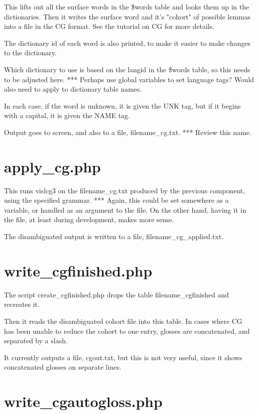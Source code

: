 \documentclass[a4paper,10pt]{article}
\begin{document}
This lifts out all the surface words in the \$words table and looks them up in the dictionaries.  Then it writes the surface word and it's "cohort" of possible lemmas into a file in the CG format.  See the tutorial on CG for more details.

The dictionary id of each word is also printed, to make it easier to make changes to the dictionary.

Which dictionary to use is based on the langid in the \$words table, so this needs to be adjusted here.
*** Perhaps use global variables to set language tags?  Would also need to apply to dictionary table names.

In each case, if the word is unknown, it is given the UNK tag, but if it begins with a capital, it is given the NAME tag.

Output goes to screen, and also to a file, filename\_cg.txt.
*** Review this name.


\section{apply\_cg.php}
\label{sec:applycg}

This runs vislcg3 on the filename\_cg.txt produced by the previous component, using the specified grammar.
*** Again, this could be set somewhere as a variable, or handled as an argument to the file.  On the other hand, having it in the file, at least during development, makes more sense.

The disambiguated output is written to a file, filename\_cg\_applied.txt.


\section{write\_cgfinished.php}
\label{sec:cgfinished}

The script create\_cgfinished.php drops the table filename\_cgfinished and recreates it.

Then it reads the disambiguated cohort file into this table.  In cases where CG has been unable to reduce the cohort to one entry, glosses are concatenated, and separated by a slash.

It currently outputs a file, cgout.txt, but this is not very useful, since it shows concatenated glosses on separate lines.


\section{write\_cgautogloss.php}
\label{sec:autoglossed}
\end{document}
